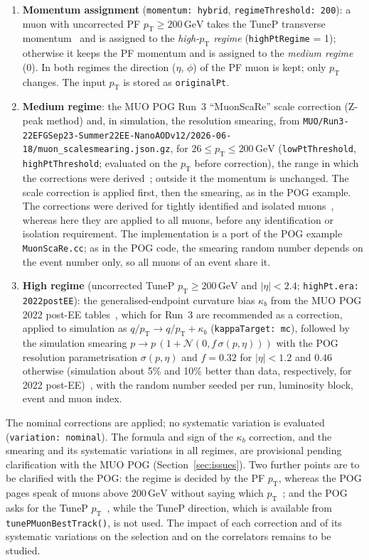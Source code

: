 \documentclass[11pt]{article}
\newcommand{\pt}{p_{\mathrm{T}}}
\newcommand{\GeV}{\ensuremath{\,\mathrm{GeV}}}
\newcommand{\code}[1]{\texttt{#1}}
\begin{document}
\begin{enumerate}
\item \textbf{Momentum assignment} (\code{momentum: hybrid}, \code{regimeThreshold: 200}): a muon with
  uncorrected PF $\pt \geq 200\GeV$ takes the TuneP transverse momentum~\cite{CMS:2019ied,MUOrecommendations} and is assigned to the \emph{high-$\pt$ regime}
  (\code{highPtRegime} = 1); otherwise it keeps the PF momentum and is assigned to the \emph{medium regime} (0). In both
  regimes the direction ($\eta$, $\phi$) of the PF muon is kept; only $\pt$ changes. The input $\pt$ is stored as
  \code{originalPt}.
\item \textbf{Medium regime}: the MUO POG Run~3 ``MuonScaRe'' scale correction (Z-peak method) and, in simulation, the
  resolution smearing, from \code{MUO/\allowbreak{}Run3-\allowbreak{}22EFGSep23-\allowbreak{}Summer22EE-\allowbreak{}NanoAODv12/\allowbreak{}2026-06-18/\allowbreak{}muon\_scalesmearing.json.gz}, for
  $26 \leq \pt \leq 200\GeV$ (\code{lowPtThreshold}, \code{highPtThreshold}; evaluated on the $\pt$ before
  correction), the range in which the corrections were derived~\cite{MUOscare}; outside it the momentum is unchanged.
  The scale correction is applied first, then the smearing, as in the POG example. The corrections were derived for
  tightly identified and isolated muons~\cite{MUOscare}, whereas here they are applied to all muons, before any
  identification or isolation requirement. The implementation is a port of the POG example \code{MuonScaRe.cc}; as in the POG code, the smearing
  random number depends on the event number only, so all muons of an event share it.
\item \textbf{High regime} (uncorrected TuneP $\pt \geq 200\GeV$ and $|\eta| < 2.4$; \code{highPt.era: 2022postEE}):
  the generalised-endpoint curvature bias $\kappa_b$ from the MUO POG 2022 post-EE tables~\cite{MUOcorrections}, which
  for Run~3 are recommended as a correction, applied to simulation as
  $q/\pt \to q/\pt + \kappa_b$ (\code{kappaTarget: mc}), followed by the simulation smearing
  $p \to p\,(1 + \mathcal{N}(0, f\,\sigma(p,\eta)))$ with the POG resolution parametrisation
  $\sigma(p,\eta)$ and $f = 0.32$ for $|\eta| < 1.2$ and $0.46$ otherwise (simulation about 5\% and 10\% better than data,
  respectively, for 2022 post-EE)~\cite{MUOcorrections}, with the random number seeded per run, luminosity block, event
  and muon index.
\end{enumerate}
The nominal corrections are applied; no systematic variation is evaluated (\code{variation: nominal}). The formula and
sign of the $\kappa_b$ correction, and the smearing and its systematic variations in all regimes, are provisional
pending clarification with the MUO POG (Section~\ref{sec:issues}). Two further points are to be clarified with the
POG: the regime is decided by the PF $\pt$, whereas the POG pages speak of muons above $200\GeV$ without saying which
$\pt$~\cite{MUOcorrections}; and the POG asks for the TuneP $\pt$~\cite{MUOrecommendations}, while the TuneP
direction, which is available from \code{tunePMuonBestTrack()}, is not used. The impact of each correction and of
its systematic variations on the selection and on the correlators remains to be studied.
\end{document}
